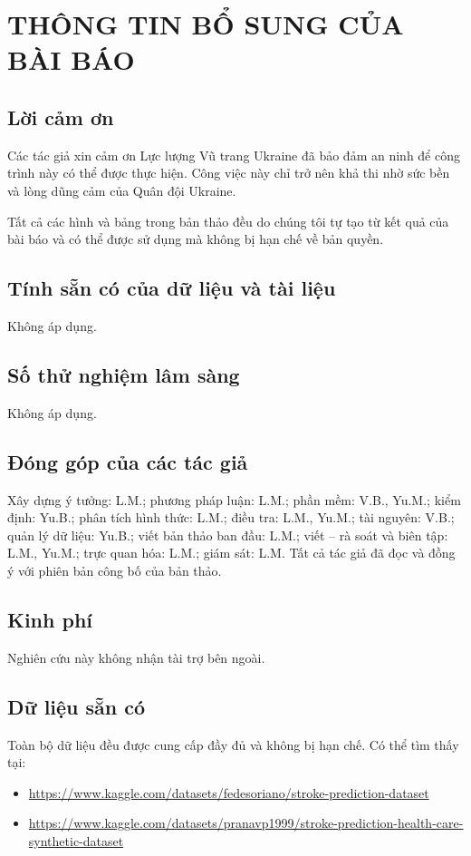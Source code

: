 \chapter*{THÔNG TIN BỔ SUNG CỦA BÀI BÁO}
\section{Lời cảm ơn}
Các tác giả xin cảm ơn Lực lượng Vũ trang Ukraine đã bảo đảm an ninh để công trình này có thể được thực hiện. Công việc này chỉ trở nên khả thi nhờ sức bền và lòng dũng cảm của Quân đội Ukraine.

Tất cả các hình và bảng trong bản thảo đều do chúng tôi tự tạo từ kết quả của bài báo và có thể được sử dụng mà không bị hạn chế về bản quyền.

\section{Tính sẵn có của dữ liệu và tài liệu}
Không áp dụng.

\section{Số thử nghiệm lâm sàng}
Không áp dụng.

\section{Đóng góp của các tác giả}
Xây dựng ý tưởng: L.M.; phương pháp luận: L.M.; phần mềm: V.B., Yu.M.; kiểm định: Yu.B.; phân tích hình thức: L.M.; điều tra: L.M., Yu.M.; tài nguyên: V.B.; quản lý dữ liệu: Yu.B.; viết bản thảo ban đầu: L.M.; viết -- rà soát và biên tập: L.M., Yu.M.; trực quan hóa: L.M.; giám sát: L.M. Tất cả tác giả đã đọc và đồng ý với phiên bản công bố của bản thảo.

\section{Kinh phí}
Nghiên cứu này không nhận tài trợ bên ngoài.

\section{Dữ liệu sẵn có}
Toàn bộ dữ liệu đều được cung cấp đầy đủ và không bị hạn chế. Có thể tìm thấy tại:
\begin{itemize}
  \item \url{https://www.kaggle.com/datasets/fedesoriano/stroke-prediction-dataset}
  \item \url{https://www.kaggle.com/datasets/pranavp1999/stroke-prediction-health-care-synthetic-dataset}
\end{itemize}

